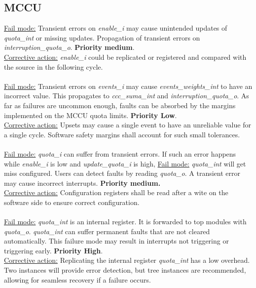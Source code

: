 \subsection{MCCU}
\underline{Fail mode:} Transient errors on\textit{ enable\_i} may cause unintended updates of \textit{quota\_int} or missing updates. Propagation of transient errors on \textit{interruption\_quota\_o}. \textbf{Priority medium}.\\
\underline{Corrective action:} \textit{ enable\_i} could be replicated or registered and compared with the source in the following cycle.\\
\\
\underline{Fail mode:} Transient errors on \textit{events\_i} may cause \textit{events\_weights\_int} to have an incorrect value. This propagates to \textit{ccc\_suma\_int} and \textit{interruption\_quota\_o}. As far as failures are uncommon enough, faults can be absorbed by the margins implemented on the MCCU quota limits. \textbf{Priority Low}.\\
\underline{Corrective action:} Upsets may cause a single event to have an unreliable value for a single cycle. Software safety margins shall account for such small tolerances.\\
\\
\underline{Fail mode:} \textit{quota\_i} can suffer from transient errors. If such an error happens while \textit{enable\_i} is low and \textit{update\_quota\_i} is high, \underline{Fail mode:} \textit{quota\_int} will get miss configured. Users can detect faults by reading \textit{quota\_o}. A transient error may cause incorrect interrupts.\textbf{ Priority medium. }\\
\underline{Corrective action:} Configuration registers shall be read after a wite on the software side to ensure correct configuration. \\
\\
\underline{Fail mode:} \textit{quota\_int} is an internal register. It is forwarded to top modules with \textit{quota\_o}. \textit{quota\_int} can suffer permanent faults that are not cleared automatically. This failure mode may result in interrupts not triggering or triggering early. \textbf{Priority High}.\\
\underline{Corrective action:}  Replicating the internal register  \textit{quota\_int} has a low overhead. Two instances will provide error detection, but tree instances are recommended, allowing for seamless recovery if a failure occurs.\\
\\
